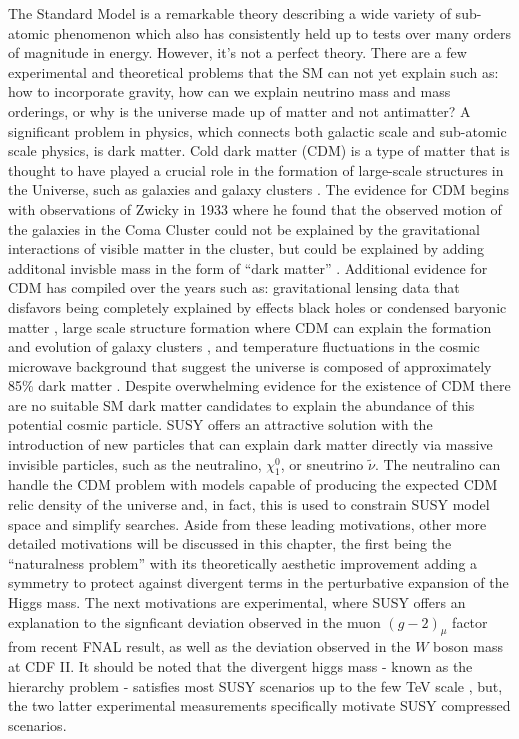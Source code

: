 The Standard Model is a remarkable theory describing a wide variety of sub-atomic phenomenon which also has consistently held up to tests over many orders of magnitude in energy. However, it's not a perfect theory. There are a few  experimental and theoretical problems that the SM can not yet explain such as: how to incorporate gravity,  how can we explain neutrino mass and mass orderings, or why is the universe made up of matter and not antimatter?  
A significant problem in physics, which connects both galactic scale and sub-atomic scale physics, is dark matter. Cold dark matter (CDM) is a type of matter that is thought to have played a crucial role in the formation of large-scale structures in the Universe, such as galaxies and galaxy clusters \cite{Garrett:2010hd}. The evidence for CDM begins with observations of Zwicky in 1933 where he found that the observed motion of the galaxies in the Coma Cluster could not be explained by the gravitational interactions of visible matter in the cluster, but could be explained by adding additonal invisble mass in the form of ``dark matter'' \cite{Zwicky:1933gu}. Additional evidence for CDM has compiled over the years such as: gravitational lensing data that disfavors being completely explained by effects black holes or condensed baryonic matter \cite{Massey:2007lens}, large scale structure formation where CDM can explain the formation and evolution of galaxy clusters \cite{Springel:2005}, and temperature fluctuations in the cosmic microwave background that suggest the universe is composed of approximately 85\% dark matter \cite{Planck:2018vyg}. Despite overwhelming evidence for the existence of CDM there are no suitable SM dark matter candidates to explain the abundance of this potential cosmic particle. SUSY offers an attractive solution with the introduction of new particles that can explain dark matter directly via massive invisible particles, such as the neutralino, $\chi_1^0$, or sneutrino $\tilde{\nu}$. The neutralino can handle the CDM problem with models capable of producing the expected CDM relic density of the universe and, in fact, this is used to constrain SUSY model space and simplify searches. Aside from these leading motivations, other more detailed motivations will be discussed in this chapter, the first being the ``naturalness problem'' with its theoretically aesthetic improvement adding a symmetry to protect against divergent terms in the perturbative expansion of the Higgs mass. The next motivations are experimental, where SUSY offers an explanation to the signficant deviation observed in the muon $(g-2)_\mu$ factor from recent FNAL result, as well as the deviation observed in the $W$ boson mass at CDF II. It should be noted that the divergent higgs mass - known as the hierarchy problem - satisfies most SUSY scenarios up to the few TeV scale \cite{Barbieri:1987fn}, but, the two latter experimental measurements specifically motivate SUSY compressed scenarios.



